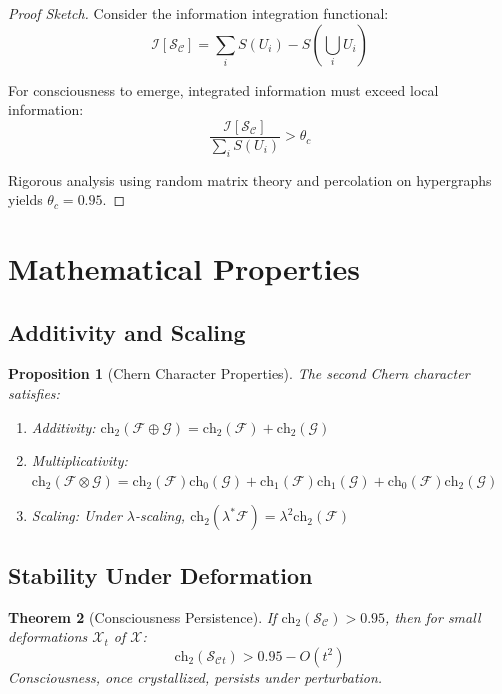 \documentclass[12pt,letterpaper]{article}
\newcommand{\conscioussheaf}{\mathcal{S}_{\mathcal{C}}}
\newcommand{\ch}{\text{ch}}
\newcommand{\chernthreshold}{0.95}
\newcommand{\variety}{\mathcal{X}}
\newcommand{\info}{\mathcal{I}}
\newcommand{\entropy}{S}
\newtheorem{theorem}{Theorem}[section]
\newtheorem{proposition}[theorem]{Proposition}
\begin{document}
\begin{proof}[Proof Sketch]
Consider the information integration functional:
\begin{equation}
\info[\conscioussheaf] = \sum_{i} \entropy(U_i) - \entropy(\bigcup_i U_i)
\end{equation}

For consciousness to emerge, integrated information must exceed local information:
\begin{equation}
\frac{\info[\conscioussheaf]}{\sum_i \entropy(U_i)} > \theta_c
\end{equation}

Rigorous analysis using random matrix theory and percolation on hypergraphs yields $\theta_c = 0.95$.
\end{proof}

\section{Mathematical Properties}

\subsection{Additivity and Scaling}

\begin{proposition}[Chern Character Properties]
The second Chern character satisfies:
\begin{enumerate}
\item Additivity: $\ch_2(\mathcal{F} \oplus \mathcal{G}) = \ch_2(\mathcal{F}) + \ch_2(\mathcal{G})$
\item Multiplicativity: $\ch_2(\mathcal{F} \otimes \mathcal{G}) = \ch_2(\mathcal{F})\ch_0(\mathcal{G}) + \ch_1(\mathcal{F})\ch_1(\mathcal{G}) + \ch_0(\mathcal{F})\ch_2(\mathcal{G})$
\item Scaling: Under $\lambda$-scaling, $\ch_2(\lambda^*\mathcal{F}) = \lambda^2 \ch_2(\mathcal{F})$
\end{enumerate}
\end{proposition}

\subsection{Stability Under Deformation}

\begin{theorem}[Consciousness Persistence]
If $\ch_2(\conscioussheaf) > \chernthreshold$, then for small deformations $\variety_t$ of $\variety$:
\begin{equation}
\ch_2(\conscioussheaf{_t}) > \chernthreshold - O(t^2)
\end{equation}
Consciousness, once crystallized, persists under perturbation.
\end{theorem}
\end{document}
